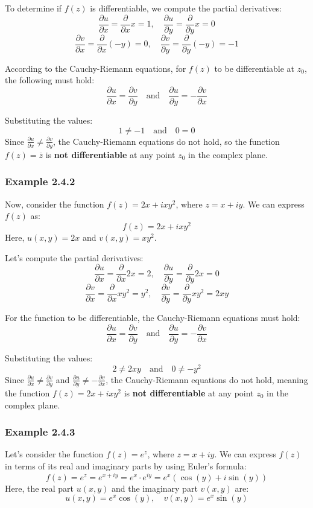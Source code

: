\documentclass[12pt]{book}
\newcommand{\pypx}[2]{\frac{\partial #1}{\partial #2}}
\begin{document}
To determine if \( f(z) \) is differentiable, we compute the partial derivatives:
\[
\pypx{u}{x} = \pypx{}{x}x = 1, \quad \pypx{u}{y} = \pypx{}{y}x = 0
\]
\[
\pypx{v}{x} = \pypx{}{x}(-y) = 0, \quad \pypx{v}{y} = \pypx{}{y}(-y) = -1
\]

According to the Cauchy-Riemann equations, for \( f(z) \) to be differentiable at \( z_0 \), the following must hold:
\[
\pypx{u}{x} = \pypx{v}{y} \quad \text{and} \quad \pypx{u}{y} = -\pypx{v}{x}
\]

Substituting the values:
\[
1 \neq -1 \quad \text{and} \quad 0 = 0
\]
Since \( \pypx{u}{x} \neq \pypx{v}{y} \), the Cauchy-Riemann equations do not hold, so the function \( f(z) = \overline{z} \) is \textbf{not differentiable} at any point \( z_0 \) in the complex plane.

\subsubsection{Example 2.4.2}

Now, consider the function \( f(z) = 2x + ixy^2 \), where \( z = x + iy \). We can express \( f(z) \) as:
\[
f(z) = 2x + ixy^2
\]
Here, \( u(x,y) = 2x \) and \( v(x,y) = xy^2 \).

Let's compute the partial derivatives:
\[
\pypx{u}{x} = \pypx{}{x}2x = 2, \quad \pypx{u}{y} = \pypx{}{y}2x = 0
\]
\[
\pypx{v}{x} = \pypx{}{x}xy^2 = y^2, \quad \pypx{v}{y} = \pypx{}{y}xy^2 = 2xy
\]

For the function to be differentiable, the Cauchy-Riemann equations must hold:
\[
\pypx{u}{x} = \pypx{v}{y} \quad \text{and} \quad \pypx{u}{y} = -\pypx{v}{x}
\]

Substituting the values:
\[
2 \neq 2xy \quad \text{and} \quad 0 \neq -y^2
\]
Since \( \pypx{u}{x} \neq \pypx{v}{y} \) and \( \pypx{u}{y} \neq -\pypx{v}{x} \), the Cauchy-Riemann equations do not hold, meaning the function \( f(z) = 2x + ixy^2 \) is \textbf{not differentiable} at any point \( z_0 \) in the complex plane.



\subsubsection{Example 2.4.3}
Let's consider the function \( f(z) = e^z \), where \( z = x + iy \). We can express \( f(z) \) in terms of its real and imaginary parts by using Euler's formula:
\[
f(z) = e^z = e^{x+iy} = e^x \cdot e^{iy} = e^x \left( \cos(y) + i \sin(y) \right)
\]
Here, the real part \( u(x,y) \) and the imaginary part \( v(x,y) \) are:
\[
u(x,y) = e^x \cos(y), \quad v(x,y) = e^x \sin(y)
\]
\end{document}
